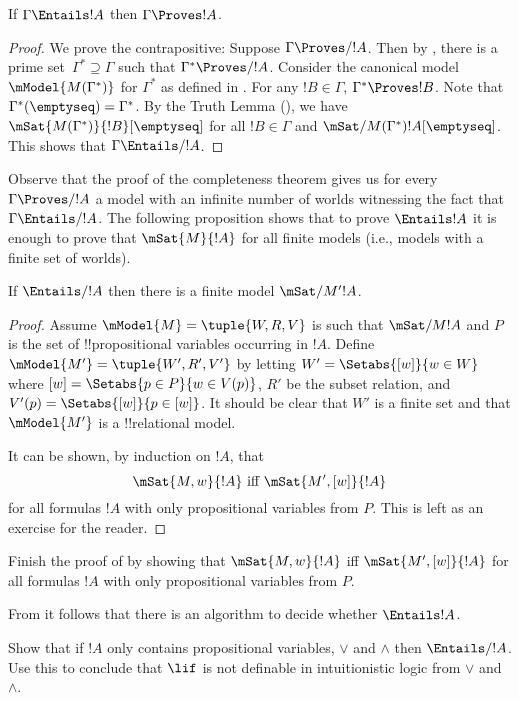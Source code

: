 \documentclass[../../../include/open-logic-section]{subfiles}
\begin{document}


\begin{thm}
  If $\Gamma \Entails !A$ then $\Gamma \Proves !A$.
\end{thm}

\begin{proof}
  We prove the contrapositive: Suppose $\Gamma \Proves/ !A$. Then by
  , there is a prime set~$\Gamma^*
  \supseteq \Gamma$ such that $\Gamma^* \Proves/ !A$. Consider the
  canonical model~$\mModel{M(\Gamma^*)}$ for $\Gamma^*$ as defined in
  . For any $!B \in \Gamma$, $\Gamma^*
  \Proves !B$. Note that $\Gamma^*(\emptyseq) = \Gamma^*$. By the Truth
  Lemma (), we have
  $\mSat{M(\Gamma^*)}{!B}[\emptyseq]$ for all $!B \in \Gamma$ and
  $\mSat/{M(\Gamma^*)}{!A}[\emptyseq]$. This shows that $\Gamma
  \Entails/ !A$.
\end{proof}

Observe that the proof of the completeness theorem gives us for 
every $\Gamma \Proves/ !A$ a model with an infinite number of worlds 
witnessing the fact that $\Gamma \Entails/ !A$. The following proposition shows 
that to prove $\Entails !A$ it is enough to prove that $\mSat{M}{!A}$ 
for all finite models (i.e., models with a finite set of worlds).

\begin{thm}
  If $\Entails/ !A$ then there is a finite model $\mSat/{M'}{!A}$.
\end{thm}
\begin{proof}
  Assume $\mModel{M}=\tuple{W, R, V}$ is such that $\mSat/{M}{!A}$ and $P$ 
  is the set of !!{propositional variable}s occurring in $!A$. Define
  $\mModel{M'}=\tuple{W', R', V'}$ by letting $W' = \Setabs{[w]}{w \in W}$ 
  where $[w] = \Setabs{p \in P}{w \in V(p)}$, $R'$ be the subset relation, 
  and $V'(p)=\Setabs{[w]}{p \in [w]}$. It should be clear that $W'$ is a 
  finite set and that $\mModel{M'}$ is a !!{relational model}.

  It can be shown, by induction on $!A$, that 
  $$ \mSat{M,w}{!A} \text{ iff } \mSat{M',[w]}{!A}$$
  for all formulas $!A$ with only propositional variables from $P$. This is left as an exercise for the reader.
\end{proof}

\begin{prob}
Finish the proof of  by showing that $\mSat{M,w}{!A}$ iff 
$\mSat{M',[w]}{!A}$ for all formulas $!A$ with only propositional variables from $P$. 
\end{prob}

From  it follows that there is an algorithm to decide whether $\Entails !A$.


\begin{prob}
Show that if $!A$ only contains propositional variables, $\lor$ and $\land$ then $\Entails/ !A$. Use this to conclude that $\lif$ is not definable in intuitionistic logic from $\lor$ and $\land$. 
\end{prob}
\end{document}
